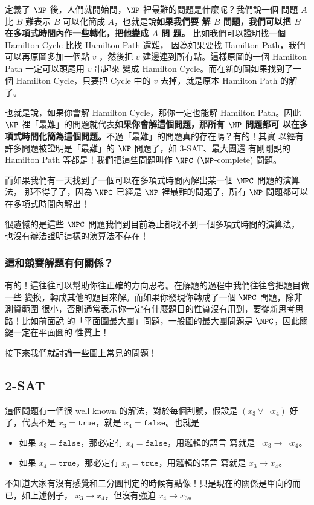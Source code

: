 \documentclass[a4paper,12pt]{book}
\begin{document}
定義了 $\NP$ 後，人們就開始問，$\NP$ 裡最難的問題是什麼呢？我們說一個
問題 $A$ 比 $B$ 難表示 $B$ 可以化簡成 $A$，也就是說{\bf 如果我們要
  解 $B$ 問題，我們可以把 $B$ 在多項式時間內作一些轉化，把他變成 $A$ 問
  題。} 比如我們可以證明找一個 Hamilton Cycle 比找 Hamilton Path 還難，
因為如果要找 Hamilton Path，我們可以再原圖多加一個點 $v$ ，然後把 $v$ 
建邊連到所有點。這樣原圖的一個 Hamilton Path 一定可以頭尾用 $v$ 串起來
變成 Hamilton Cycle。而在新的圖如果找到了一個 Hamilton Cycle，只要把
Cycle 中的 $v$ 去掉，就是原本 Hamilton Path 的解了。

也就是說，如果你會解 Hamilton Cycle，那你一定也能解 Hamilton Path。因此
$\NP$ 裡「最難」的問題就代表{\bf 如果你會解這個問題，那所有 $\NP$ 問題都可
  以在多項式時間化簡為這個問題。}不過「最難」的問題真的存在嗎？有的！其實
以經有許多問題被證明是「最難」的 $\NP$ 問題了，如 3-SAT、最大團還
有剛剛說的 Hamilton Path 等都是！我們把這些問題叫作 $\NPC$ ($\NP$-complete)
問題。

而如果我們有一天找到了一個可以在多項式時間內解出某一個 $\NPC$ 問題的演算法，
那不得了了，因為 $\NPC$ 已經是 $\NP$ 裡最難的問題了，所有 $\NP$ 問題都可以
在多項式時間內解出！

很遺憾的是這些 $\NPC$ 問題我們到目前為止都找不到一個多項式時間的演算法，
也沒有辦法證明這樣的演算法不存在！

\subsubsection{這和競賽解題有何關係？}
有的！這往往可以幫助你往正確的方向思考。在解題的過程中我們往往會把題目做一些
變換，轉成其他的題目來解。而如果你發現你轉成了一個 $\NPC$ 問題，除非測資範圍
很小，否則通常表示你一定有什麼題目的性質沒有用到，要從新思考思路！比如前面說
的「平面圖最大團」問題，一般圖的最大團問題是 $\NPC$，因此關鍵一定在平面圖的
性質上！

接下來我們就討論一些圖上常見的問題！

\subsection{2-SAT}
這個問題有一個很 well known 的解法，對於每個刮號，假設是 $(x_3 \lor \lnot x_4)$
好了，代表不是 $x_3 = \texttt{true}$，就是 $x_4 = \texttt{false}$。也就是
\begin{itemize}
  \item 如果 $x_3 = \texttt{false}$，那必定有 $x_4 = \texttt{false}$，用邏輯的語言
    寫就是 $\lnot x_3 \rightarrow \lnot x_4$。
  \item 如果 $x_4 = \texttt{true}$，那必定有 $x_3 = \texttt{true}$，用邏輯的語言
    寫就是 $x_3 \rightarrow x_4$。
\end{itemize}
不知道大家有沒有感覺和二分圖判定的時候有點像！只是現在的關係是單向的而已，如上述例子，
$x_3 \rightarrow x_4$，但沒有強迫 $x_4 \to x_3$。
\end{document}
